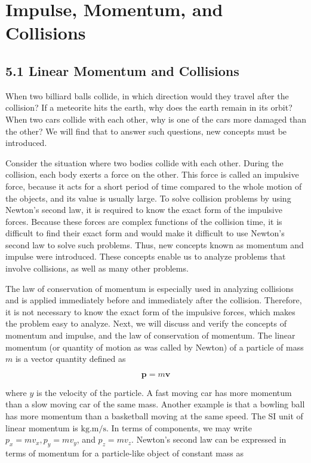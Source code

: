 \documentclass[10pt]{article}
\begin{document}
\section*{Impulse, Momentum, and Collisions}
\subsection*{5.1 Linear Momentum and Collisions}
When two billiard balls collide, in which direction would they travel after the collision? If a meteorite hits the earth, why does the earth remain in its orbit? When two cars collide with each other, why is one of the cars more damaged than the other? We will find that to answer such questions, new concepts must be introduced.

Consider the situation where two bodies collide with each other. During the collision, each body exerts a force on the other. This force is called an impulsive force, because it acts for a short period of time compared to the whole motion of the objects, and its value is usually large. To solve collision problems by using Newton's second law, it is required to know the exact form of the impulsive forces. Because these forces are complex functions of the collision time, it is difficult to find their exact form and would make it difficult to use Newton's second law to solve such problems. Thus, new concepts known as momentum and impulse were introduced. These concepts enable us to analyze problems that involve collisions, as well as many other problems.

The law of conservation of momentum is especially used in analyzing collisions and is applied immediately before and immediately after the collision. Therefore, it is not necessary to know the exact form of the impulsive forces, which makes the problem easy to analyze. Next, we will discuss and verify the concepts of momentum and impulse, and the law of conservation of momentum. The linear momentum (or quantity of motion as was called by Newton) of a particle of mass $m$ is a vector quantity defined as

$$
\mathbf{p}=m \mathbf{v}
$$

where $y$ is the velocity of the particle. A fast moving car has more momentum than a slow moving car of the same mass. Another example is that a bowling ball has more momentum than a basketball moving at the same speed. The SI unit of linear momentum is $\mathrm{kg} . \mathrm{m} / \mathrm{s}$. In terms of components, we may write $p_{x}=m v_{x}, p_{y}=m v_{y}$, and $p_{z}=m v_{z}$. Newton's second law can be expressed in terms of momentum for a particle-like object of constant mass as
\end{document}
